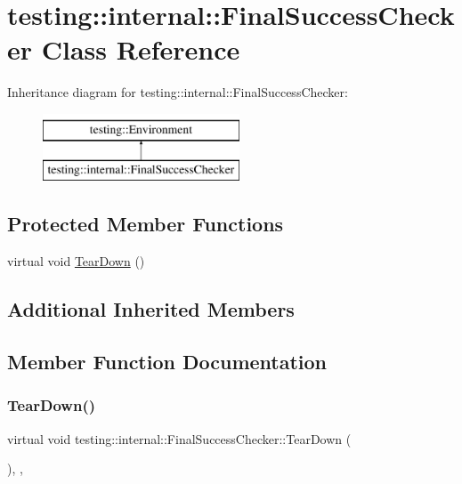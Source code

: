 \hypertarget{classtesting_1_1internal_1_1FinalSuccessChecker}{}\section{testing\+::internal\+::Final\+Success\+Checker Class Reference}
\label{classtesting_1_1internal_1_1FinalSuccessChecker}
Inheritance diagram for testing\+::internal\+::Final\+Success\+Checker\+:\begin{figure}[H]
\begin{center}
\leavevmode
\includegraphics[height=2.000000cm]{classtesting_1_1internal_1_1FinalSuccessChecker}
\end{center}
\end{figure}
\subsection*{Protected Member Functions}
\begin{DoxyCompactItemize}
\item 
virtual void \mbox{\hyperlink{classtesting_1_1internal_1_1FinalSuccessChecker_a8f39d12a1f2bfe8c6c04b5c6749382c9}{Tear\+Down}} ()
\end{DoxyCompactItemize}
\subsection*{Additional Inherited Members}


\subsection{Member Function Documentation}
\mbox{\label{classtesting_1_1internal_1_1FinalSuccessChecker_a8f39d12a1f2bfe8c6c04b5c6749382c9}} 
\subsubsection{\texorpdfstring{TearDown()}{TearDown()}}
{\footnotesize\ttfamily virtual void testing\+::internal\+::\+Final\+Success\+Checker\+::\+Tear\+Down (\begin{DoxyParamCaption}{ }\end{DoxyParamCaption})\hspace{0.3cm}{\ttfamily [inline]}, {\ttfamily [protected]}, {\ttfamily [virtual]}}



